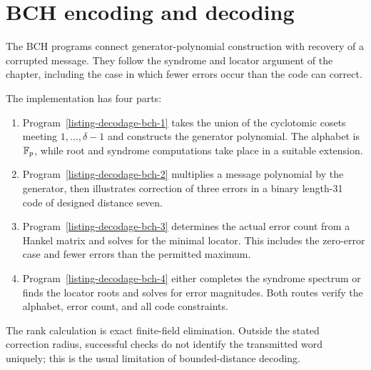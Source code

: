 \section{BCH encoding and decoding}
\label{sect1-listing-decoding-bch}

The BCH programs connect generator-polynomial construction with recovery of
a corrupted message. They follow the syndrome and locator argument of the
chapter, including the case in which fewer errors occur than the code can
correct.

The implementation has four parts:
\begin{enumerate}
\item Program~\ref{listing-decodage-bch-1} takes the union of the cyclotomic
cosets meeting $1,\ldots,\delta-1$ and constructs the generator polynomial.
The alphabet is $\mathbb{F}_p$, while root and syndrome computations take place
in a suitable extension.
\item Program~\ref{listing-decodage-bch-2} multiplies a message polynomial
by the generator, then illustrates correction of three errors in a binary
length-31 code of designed distance seven.
\item Program~\ref{listing-decodage-bch-3} determines the actual error
count from a Hankel matrix and solves for the minimal locator. This
includes the zero-error case and fewer errors than the permitted maximum.
\item Program~\ref{listing-decodage-bch-4} either completes the syndrome
spectrum or finds the locator roots and solves for error magnitudes.
Both routes verify the alphabet, error count, and all code constraints.
\end{enumerate}
The rank calculation is exact finite-field elimination. Outside the stated
correction radius, successful checks do not identify the transmitted word
uniquely; this is the usual limitation of bounded-distance decoding.
\begin{listing}[H]
\caption{Constructing the generator of a prime-alphabet BCH code.}
\label{listing-decodage-bch-1}
\end{listing}
\begin{listing}[H]
\caption{BCH encoding and an independently checked decoding example.}
\label{listing-decodage-bch-2}
\end{listing}
\begin{listing}[H]
\caption{Recovering the actual locator degree and its coefficients.}
\label{listing-decodage-bch-3}
\end{listing}
\begin{listing}[H]
\caption{BCH decoding by spectrum completion or locator roots.}
\label{listing-decodage-bch-4}
\end{listing}
